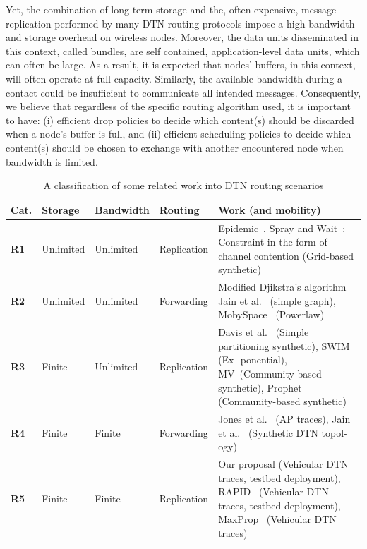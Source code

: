 Yet, the combination of long-term storage and the, often expensive, message replication performed by many DTN routing protocols impose a high bandwidth and storage overhead on wireless nodes. Moreover, the data units disseminated in this context, called bundles, are self contained, application-level data units, which can often be large. As a result, it is expected that nodes' buffers, in this context, will often operate at full capacity. Similarly, the available bandwidth during a contact could be insufficient to communicate all intended messages. Consequently, we believe that regardless of the specific routing algorithm used, it is important to have: (i) efficient drop policies to decide which content(s) should be discarded when a node's buffer is full, and (ii) efficient scheduling policies to decide which content(s) should be chosen to exchange with another encountered node when bandwidth is limited. 
\begin{table}[!h]
\renewcommand{\arraystretch}{1.1}
\caption{A classification of some related work into DTN routing scenarios}
\centering
\footnotesize
\begin{tabular}{|p{1cm}|p{1.5cm}|p{1.7cm}|p{1.5cm}|p{5cm}|}
\hline
\bfseries Cat. &\bfseries Storage &\bfseries Bandwidth  &\bfseries Routing& \bfseries Work (and mobility)\\
\hline
\bfseries R1&Unlimited & Unlimited &Replication & Epidemic~\cite{Vahdat:epidemic}, Spray and Wait~\cite{akis:wdtn}: Constraint in the form of
channel contention (Grid-based synthetic)\\
\hline
\bfseries R2&Unlimited & Unlimited &Forwarding & Modified Djikstra's algorithm Jain et al.~\cite{Fall:DTNrouting} (simple graph),
MobySpace~\cite{DTNSpace} (Powerlaw)\\
\hline
\bfseries R3&Finite & Unlimited &Replication &Davis et al.~\cite{Wearable} (Simple partitioning synthetic), SWIM~\cite{Haas:wdtn} (Ex-
ponential), MV~\cite{MVRouting}(Community-based synthetic), Prophet~\cite{prophet03}
(Community-based synthetic) \\
\hline
\bfseries R4&Finite & Finite & Forwarding& Jones et al.~\cite{Waterloo:wdtn} (AP traces), Jain et al.~\cite{Fall:DTNrouting} (Synthetic DTN topol-
ogy)\\
\hline
\bfseries R5&Finite & Finite &Replication & Our proposal (Vehicular DTN traces, testbed deployment), RAPID~\cite{Levine:Sigcomm07} (Vehicular DTN traces, testbed deployment), MaxProp~\cite{Levine:MaxProp} (Vehicular DTN traces) \\
\hline
\end{tabular}
\label{RoutingSummary}
\end{table}

